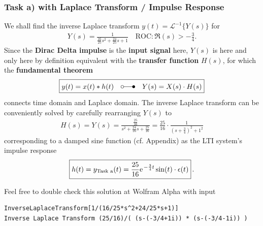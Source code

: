 \documentclass[11pt,a4paper,DIV=12]{scrartcl}
\begin{document}
\subsubsection{Task a) with Laplace Transform / Impulse Response}
\label{sec:TransferFunction}
We shall find the inverse Laplace transform
$y(t) = \mathcal{L}^{-1}\{Y(s)\}$ for
\begin{align}
Y(s) = \frac{1}{\frac{16}{25} s^2 + \frac{24}{25} s + 1}
\quad \text{ROC}: \Re(s) > -\frac{3}{4}.
\end{align}
Since the \textbf{Dirac Delta impulse} is the \textbf{input signal} here,
$Y(s)$ is here and only here by definition equivalent with the
\textbf{transfer function} $H(s)$, for which the \textbf{fundamental theorem}
\begin{align}
\boxed{y(t) = x(t)*h(t) \quad \laplace \quad Y(s) = X(s) \cdot H(s)}
\end{align}
connects time domain and Laplace domain.
%
The inverse Laplace transform can be conveniently solved by carefully
rearranging
$Y(s)$ to
\begin{align}
H(s) = Y(s) = \frac{\frac{25}{16}}{s^2 + \frac{24}{16} s + \frac{25}{16}}=
\frac{25}{16} \cdot \frac{1}{(s + \frac{3}{4})^2 + 1^2}
\end{align}
corresponding to a damped sine function (cf. Appendix) as the LTI system's
impulse response
\begin{align}
\boxed{h(t) = y_\text{Task a}(t) = \frac{25}{16} \e^{-\frac{3}{4} t} \sin(t)
\cdot \epsilon(t)}\,.
\end{align}

Feel free to double check this solution at Wolfram Alpha with input
\begin{verbatim}
InverseLaplaceTransform[1/(16/25*s^2+24/25*s+1)]
Inverse Laplace Transform (25/16)/( (s-(-3/4+1i)) * (s-(-3/4-1i)) )
\end{verbatim}
\end{document}
